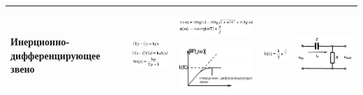 \documentclass[14pt,a4paper,report]{report}
\begin{document}
\begin{table}[h!]
\begin{tabular}{ | m{3cm} | m{3.5cm} | m{4.5cm} | m{2.5cm} | m{2.5cm} }
		Инерционно-дифференцирующее звено
		&
		\begin{minipage}{.3\textwidth}
			\includegraphics[scale = 0.5]{images/6_2.png}
		\end{minipage}
		&
		\begin{minipage}{.3\textwidth}
			\includegraphics[scale = 0.4]{images/6_3_f.png}
		\end{minipage}
		\begin{minipage}{.3\textwidth}
			\includegraphics[scale = 0.5]{images/6_3.png}
		\end{minipage}
		&
		\begin{minipage}{.3\textwidth}
			\includegraphics[scale = 0.4]{images/6_4.png}
		\end{minipage}
		&
		\begin{minipage}{.3\textwidth}
			\includegraphics[scale = 0.32]{images/6_5.png}
		\end{minipage} \\ \hline	
	\end{tabular}
	\egroup
\end{table}
\end{document}
